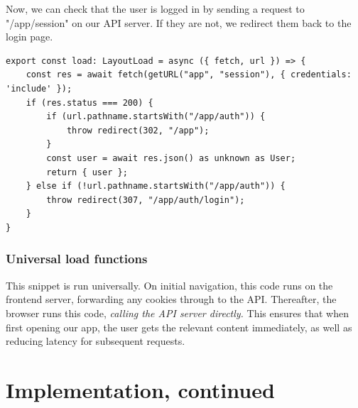 \documentclass{report}
\begin{document}
Now, we can check that the user is logged in by sending a request to "/app/session" on our API server. If they are not, we redirect them back to the login page.

\begin{verbatim}
export const load: LayoutLoad = async ({ fetch, url }) => {
	const res = await fetch(getURL("app", "session"), { credentials: 'include' });
	if (res.status === 200) {
		if (url.pathname.startsWith("/app/auth")) {
			throw redirect(302, "/app");
		}
		const user = await res.json() as unknown as User;
		return { user };
	} else if (!url.pathname.startsWith("/app/auth")) {
		throw redirect(307, "/app/auth/login");
	}
}
\end{verbatim}

\subsection{Universal load functions}
This snippet is run universally. On initial navigation, this code runs on the frontend server, forwarding any cookies through to the API. Thereafter, the browser runs this code, \emph{calling the API server directly.} This ensures that when first opening our app, the user gets the relevant content immediately, as well as reducing latency for subsequent requests.

\chapter{Implementation, continued}
\end{document}
